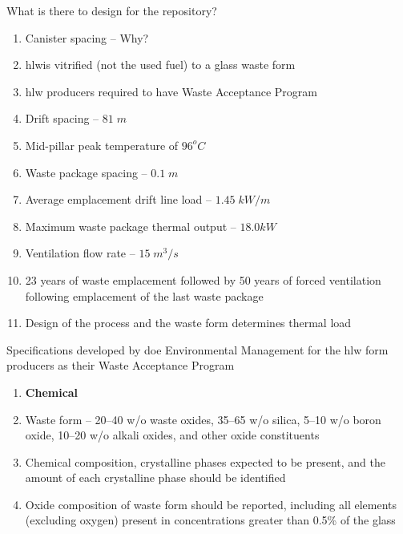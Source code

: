 \documentclass[aspectratio=1610,pdftex,dvipsnames,compress,xcolor={dvipsnames}]{beamer}
\newcommand{\acs}{\acrshort} %
\begin{document}
\addtocounter{framenumber}{-1} 
\begin{frame}{What is there to design for the repository?}
    \begin{enumerate}[series=outerlist,topsep=0pt,itemsep=7pt,leftmargin=*,label=(\arabic*)]
        \item[]Canister spacing -- Why?
        \item[]\acs{hlw}is vitrified (not the used fuel) to a glass waste form
        \item[]\acs{hlw} producers required to have Waste Acceptance Program 
        \item[]Drift spacing -- $81 \; m$
        \item[]Mid-pillar peak temperature of $96^oC$
        \item[]Waste package spacing -- $0.1 \; m$
        \item[]Average emplacement drift line load -- $1.45 \; kW/m$
        \item[]Maximum waste package thermal output -- $18.0 kW$
        \item[]Ventilation flow rate -- $15 \; m^3/s$
        \item[]23 years of waste emplacement followed by 50 years of forced ventilation following emplacement of the last waste package
        \item[]Design of the process and the waste form determines thermal load
    \end{enumerate}
\end{frame}


\begin{frame}{Specifications developed by \acs{doe} Environmental Management for the \acs{hlw} form producers as their Waste Acceptance Program}
    \begin{enumerate}[series=outerlist,topsep=0pt,itemsep=7pt,leftmargin=*,label=(\arabic*)]
        \item[]\textbf{Chemical}
        \item[]Waste form -- 20--40 w/o waste oxides, 35--65 w/o silica, 5--10 w/o boron oxide, 10--20 w/o alkali oxides, and other oxide constituents
        \item[]Chemical composition, crystalline phases expected to be present, and the amount of each crystalline phase should be identified
        \item[]Oxide composition of waste form should be reported, including all elements (excluding oxygen) present in concentrations greater than 0.5\% of the glass
    \end{enumerate}
\end{frame}
\end{document}
